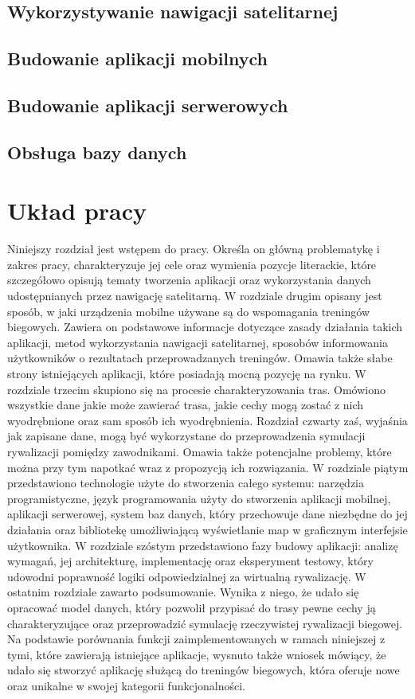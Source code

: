 \subsection{Wykorzystywanie nawigacji satelitarnej}
\subsection{Budowanie aplikacji mobilnych}
\subsection{Budowanie aplikacji serwerowych}
\subsection{Obsługa bazy danych}

\section{Układ pracy}
Niniejszy rozdział jest wstępem do pracy. Określa on główną problematykę i zakres pracy, charakteryzuje jej cele oraz wymienia pozycje literackie, które szczegółowo opisują tematy tworzenia aplikacji oraz wykorzystania danych udostępnianych przez nawigację satelitarną. W rozdziale drugim opisany jest sposób, w jaki urządzenia mobilne używane są do wspomagania treningów biegowych. Zawiera on podstawowe informacje dotyczące zasady działania takich aplikacji, metod wykorzystania nawigacji satelitarnej, sposobów informowania użytkowników o rezultatach przeprowadzanych treningów. Omawia także słabe strony istniejących aplikacji, które posiadają mocną pozycję na rynku. W rozdziale trzecim skupiono się na procesie charakteryzowania tras. Omówiono wszystkie dane jakie może zawierać trasa, jakie cechy mogą zostać z nich wyodrębnione oraz sam sposób ich wyodrębnienia. Rozdział czwarty zaś, wyjaśnia jak zapisane dane, mogą być wykorzystane do przeprowadzenia symulacji rywalizacji pomiędzy zawodnikami. Omawia także potencjalne problemy, które można przy tym napotkać wraz z propozycją ich rozwiązania. W rozdziale piątym przedstawiono technologie użyte do stworzenia całego systemu: narzędzia programistyczne, język programowania użyty do stworzenia aplikacji mobilnej, aplikacji serwerowej, system baz danych, który przechowuje dane niezbędne do jej działania oraz bibliotekę umożliwiającą wyświetlanie map w graficznym interfejsie użytkownika. W rozdziale szóstym przedstawiono fazy budowy aplikacji: analizę wymagań, jej architekturę, implementację oraz eksperyment testowy, który udowodni poprawność logiki odpowiedzialnej za wirtualną rywalizację. W ostatnim rozdziale zawarto podsumowanie. Wynika z niego, że udało się opracować model danych, który pozwolił przypisać do trasy pewne cechy ją charakteryzujące oraz przeprowadzić symulację rzeczywistej rywalizacji biegowej. Na podstawie porównania funkcji zaimplementowanych w ramach niniejszej z tymi, które zawierają istniejące aplikacje, wysnuto także wniosek mówiący, że udało się stworzyć aplikację służącą do treningów biegowych, która oferuje nowe oraz unikalne w swojej kategorii funkcjonalności.